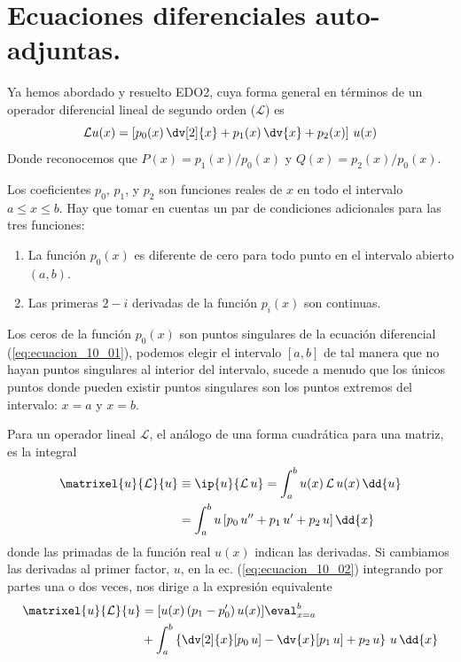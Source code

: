 \section{Ecuaciones diferenciales auto-adjuntas.}
Ya hemos abordado y resuelto EDO2, cuya forma general en términos de un operador diferencial lineal de segundo orden ($\mathcal{L}$) es
\begin{equation}
\mathcal{L} u(x) = \left[ p_{0}(x) \, \dv[2]{x} + p_{1}(x) \, \dv{x} + p_{2}(x) \right] \, u(x)
\label{eq:ecuacion_10_01}
\end{equation}
Donde reconocemos que $P(x) = p_{1}(x)/p_{0}(x)$ y $Q(x)= p_{2}(x)/p_{0}(x)$.
\par
Los coeficientes $p_{0}$, $p_{1}$, y $p_{2}$ son funciones reales de $x$ en todo el intervalo $a \leq x \leq b$. Hay que tomar en cuentas un par de condiciones adicionales para las tres funciones:
\begin{enumerate}
\item La función $p_{0}(x)$ es diferente de cero para todo punto en el intervalo abierto $(a,b)$.
\item Las primeras $2-i$ derivadas de la función $p_{i}(x)$ son continuas.
\end{enumerate}
Los ceros de la función $p_{0}(x)$ son puntos singulares de la ecuación diferencial (\ref{eq:ecuacion_10_01}), podemos elegir el intervalo $[a,b]$ de tal manera que no hayan puntos singulares al interior del intervalo, sucede a menudo que los únicos puntos donde pueden existir puntos singulares son los puntos extremos del intervalo: $x = a$ y $x = b$.
\par
Para un operador lineal $\mathcal{L}$, el análogo de una forma cuadrática para una matriz, es la integral
\begin{align}
\begin{aligned}
\matrixel{u}{\mathcal{L}}{u} &\equiv \ip{u}{\mathcal{L} \, u} = \int_{a}^{b} u(x) \, \mathcal{L} \, u(x) \, \dd{u} \\
&= \int_{a}^{b} u \, [ p_{0} \, u^{\prime \prime} + p_{1} \, u^{\prime} + p_{2} \, u ] \, \dd{x}
\end{aligned}
\label{eq:ecuacion_10_02}
\end{align}
donde las primadas de la función real $u(x)$ indican las derivadas. Si cambiamos las derivadas al primer factor, $u$, en la ec. (\ref{eq:ecuacion_10_02}) integrando por partes una o dos veces, nos dirige a la expresión equivalente
\begin{align}
\begin{aligned}
\matrixel{u}{\mathcal{L}}{u} &= [ u(x) \, ( p_{1} - p_{0}^{\prime} ) \, u(x)] \eval_{x=a}^{b} \\
&+ \int_{a}^{b} \left\{ \dv[2]{x} [p_{0} \, u] - \dv{x} [p_{1} \, u] + p_{2} \, u \right\} \, u \, \dd{x}
\end{aligned}
\label{eq:ecuacion_10_03}
\end{align}
